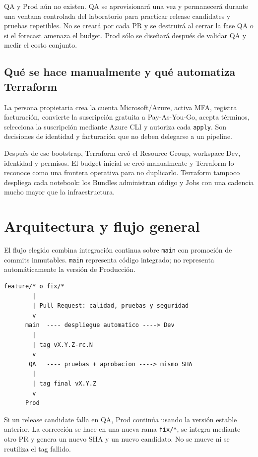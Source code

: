 \documentclass[11pt,a4paper]{article}
\begin{document}
QA y Prod aún no existen. QA se aprovisionará una vez y permanecerá durante una ventana controlada
del laboratorio para practicar release candidates y pruebas repetibles. No se creará por cada PR y se
destruirá al cerrar la fase QA o si el forecast amenaza el budget. Prod sólo se diseñará después de
validar QA y medir el costo conjunto.

\subsection{Qué se hace manualmente y qué automatiza Terraform}

La persona propietaria crea la cuenta Microsoft/Azure, activa MFA, registra facturación, convierte la
suscripción gratuita a Pay-As-You-Go, acepta términos, selecciona la suscripción mediante Azure CLI y
autoriza cada \texttt{apply}. Son decisiones de identidad y facturación que no deben delegarse a un
pipeline.

Después de ese bootstrap, Terraform creó el Resource Group, workspace Dev, identidad y permisos. El
budget inicial se creó manualmente y Terraform lo reconoce como una frontera operativa para no
duplicarlo. Terraform tampoco despliega cada notebook: los Bundles administran código y Jobs con una
cadencia mucho mayor que la infraestructura.

\section{Arquitectura y flujo general}

El flujo elegido combina integración continua sobre \texttt{main} con promoción de commits
inmutables. \texttt{main} representa código integrado; no representa automáticamente la versión de
Producción.

\begin{lstlisting}
feature/* o fix/*
        |
        | Pull Request: calidad, pruebas y seguridad
        v
      main  ---- despliegue automatico ----> Dev
        |
        | tag vX.Y.Z-rc.N
        v
       QA   ---- pruebas + aprobacion ----> mismo SHA
        |
        | tag final vX.Y.Z
        v
      Prod
\end{lstlisting}

Si un release candidate falla en QA, Prod continúa usando la versión estable anterior. La corrección
se hace en una nueva rama \texttt{fix/*}, se integra mediante otro PR y genera un nuevo SHA y un nuevo
candidato. No se mueve ni se reutiliza el tag fallido.
\end{document}
